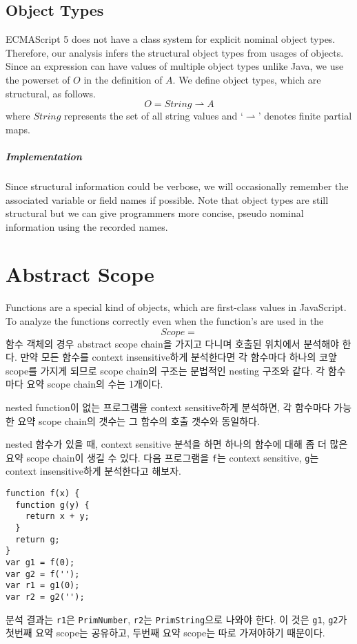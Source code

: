 \documentclass{report}
\begin{document}
\section{Object Types}
ECMAScript 5 does not have a class system for explicit nominal object types. 
Therefore, our analysis infers the structural object types 
from usages of objects.
Since an expression can have values of multiple object types unlike Java,
we use the powerset of $O$ in the definition of $A$.
We define object types, which are structural, as follows.
\[
O = String \rightharpoonup A
\]
where $String$ represents the set of all string values 
and `$\rightharpoonup$' denotes finite partial maps. 

\paragraph{Implementation}
Since structural information could be verbose, 
we will occasionally remember the associated variable or field names 
if possible.
Note that object types are still structural but we can give programmers 
more concise, pseudo nominal information using the recorded names.

\chapter{Abstract Scope}
Functions are a special kind of objects, 
which are first-class values in JavaScript. 
To analyze the functions correctly even when the function's are used in the 
\[
Scope = 
\]
함수 객체의 경우 abstract scope chain을 가지고 다니며 호출된 위치에서 분석해야 한다.
만약 모든 함수를 context insensitive하게 분석한다면 
각 함수마다 하나의 코앞 scope를 가지게 되므로 
scope chain의 구조는 문법적인 nesting 구조와 같다. 
각 함수마다 요약 scope chain의 수는 1개이다.

nested function이 없는 프로그램을 context sensitive하게 분석하면, 
각 함수마다 가능한 요약 scope chain의 갯수는 그 함수의 호출 갯수와 동일하다. 

nested 함수가 있을 때, context sensitive 분석을 하면 
하나의 함수에 대해 좀 더 많은 요약 scope chain이 생길 수 있다.
다음 프로그램을 \texttt{f}는 context sensitive, \texttt{g}는 context insensitive하게
분석한다고 해보자.
\begin{verbatim}
function f(x) {
  function g(y) {
    return x + y;
  }
  return g;
}
var g1 = f(0);
var g2 = f('');
var r1 = g1(0);
var r2 = g2('');
\end{verbatim}
분석 결과는 \texttt{r1}은 \texttt{PrimNumber}, \texttt{r2}는 \texttt{PrimString}으로
나와야 한다. 이 것은 \texttt{g1}, \texttt{g2}가 첫번째 요약 scope는 공유하고,
두번째 요약 scope는 따로 가져야하기 때문이다.
\end{document}
